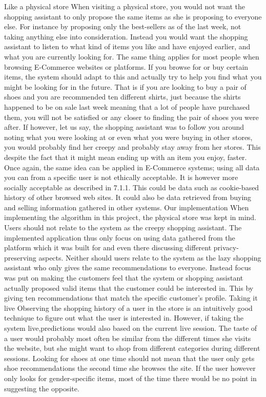 Like a physical store
When visiting a physical store, you would not want the shopping assistant to only propose the same items as she is proposing to everyone else. For instance by proposing only
the best-sellers as of the last week, not taking anything else into consideration. Instead
you would want the shopping assistant to listen to what kind of items you like and have
enjoyed earlier, and what you are currently looking for. The same thing applies for most
people when browsing E-Commerce websites or platforms. If you browse for or buy certain items, the system should adapt to this and actually try to help you find what you
might be looking for in the future. That is if you are looking to buy a pair of shoes and
you are recommended ten different shirts, just because the shirts happened to be on sale
last week meaning that a lot of people have purchased them, you will not be satisfied or
any closer to finding the pair of shoes you were after.
If however, let us say, the shopping assistant was to follow you around noting what
you were looking at or even what you were buying in other stores, you would probably
find her creepy and probably stay away from her stores. This despite the fact that it
might mean ending up with an item you enjoy, faster. Once again, the same idea can
be applied in E-Commerce systems; using all data you can from a specific user is not
ethically acceptable. It is however more socially acceptable as described in 7.1.1. This
could be data such as cookie-based history of other browsed web sites. It could also be
data retrieved from buying and selling information gathered in other systems.
Our implementation
When implementing the algorithm in this project, the physical store was kept in mind.
Users should not relate to the system as the creepy shopping assistant. The implemented
application thus only focus on using data gathered from the platform which it was built
for and even there discussing different privacy-preserving aspects. Neither should users
relate to the system as the lazy shopping assistant who only gives the same recommendations to everyone. Instead focus was put on making the customers feel that the system or
shopping assistant actually proposed valid items that the customer could be interested
in. This by giving ten recommendations that match the specific customer’s profile.
Taking it live
Observing the shopping history of a user in the store is an intuitively good technique to
figure out what the user is interested in. However, if taking the system live,predictions
would also based on the current live session. The taste of a user would probably most
often be similar from the different times she visits the website, but she might want to
shop from different categories during different sessions. Looking for shoes at one time
should not mean that the user only gets shoe recommendations the second time she
browses the site. If the user however only looks for gender-specific items, most of the
time there would be no point in suggesting the opposite.

